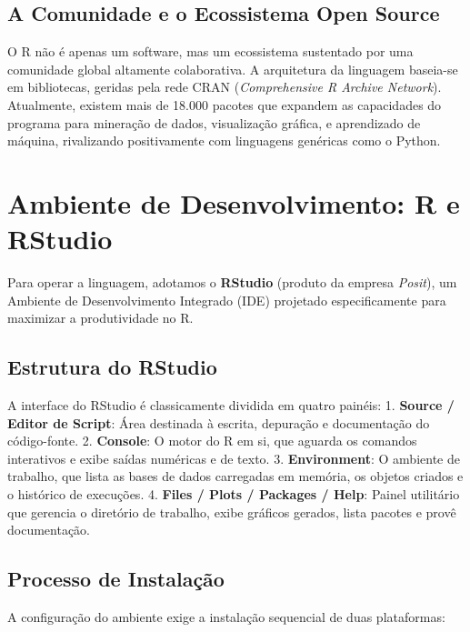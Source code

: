 \documentclass[
  brazilian,
  11pt,
  a4paper,
  open = right,
  twoside = true]{scrbook}
\begin{document}
\section{A Comunidade e o Ecossistema Open
Source}\label{a-comunidade-e-o-ecossistema-open-source}

O R não é apenas um software, mas um ecossistema sustentado por uma
comunidade global altamente colaborativa. A arquitetura da linguagem
baseia-se em bibliotecas, geridas pela rede CRAN (\emph{Comprehensive R
Archive Network}). Atualmente, existem mais de 18.000 pacotes que
expandem as capacidades do programa para mineração de dados,
visualização gráfica, e aprendizado de máquina, rivalizando
positivamente com linguagens genéricas como o Python.

\chapter{Ambiente de Desenvolvimento: R e
RStudio}\label{ambiente-de-desenvolvimento-r-e-rstudio}

Para operar a linguagem, adotamos o \textbf{RStudio} (produto da empresa
\emph{Posit}), um Ambiente de Desenvolvimento Integrado (IDE) projetado
especificamente para maximizar a produtividade no R.

\section{Estrutura do RStudio}\label{estrutura-do-rstudio}

A interface do RStudio é classicamente dividida em quatro painéis: 1.
\textbf{Source / Editor de Script}: Área destinada à escrita, depuração
e documentação do código-fonte. 2. \textbf{Console}: O motor do R em si,
que aguarda os comandos interativos e exibe saídas numéricas e de texto.
3. \textbf{Environment}: O ambiente de trabalho, que lista as bases de
dados carregadas em memória, os objetos criados e o histórico de
execuções. 4. \textbf{Files / Plots / Packages / Help}: Painel
utilitário que gerencia o diretório de trabalho, exibe gráficos gerados,
lista pacotes e provê documentação.

\section{Processo de Instalação}\label{processo-de-instalauxe7uxe3o}

A configuração do ambiente exige a instalação sequencial de duas
plataformas:
\end{document}
